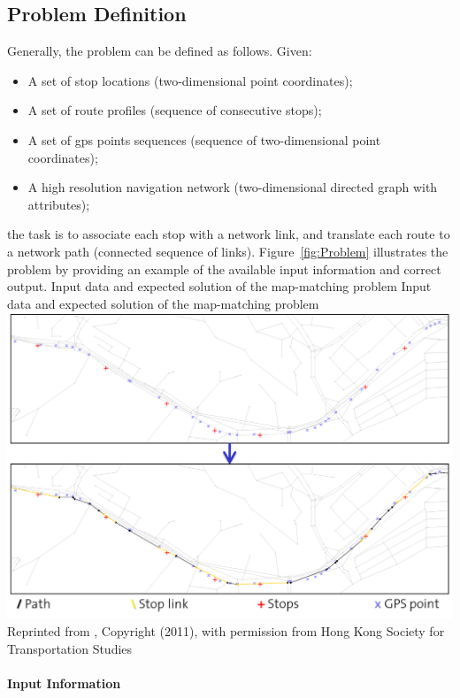 \subsection{Problem Definition}
Generally, the problem can be defined as follows. Given:
%
\begin{itemize}\styleItemize
\item A set of stop locations (two-dimensional point coordinates);
\item A set of route profiles (sequence of consecutive stops);
\item A set of \gls{gps} points sequences (sequence of two-dimensional point coordinates);
\item A high resolution navigation network (two-dimensional directed graph with attributes);
\end{itemize}
%
the task is to associate each stop with a network link, and translate each route to a network path (connected sequence of links). Figure~\ref{fig:Problem} illustrates the problem by providing an example of the available input information and correct output.
%
\createfigure
{Input data and expected solution of the map-matching problem}
{Input data and expected solution of the map-matching problem}
{\label{fig:Problem}}
{\includegraphics[width=1.0\textwidth]{extending/figures/semiAuto/Problem.png}}
{Reprinted from \citet[][p.753]{Ordonez_HKSTS_2011}, Copyright (2011), with permission from Hong Kong Society for Transportation Studies}

\paragraph{Input Information}

